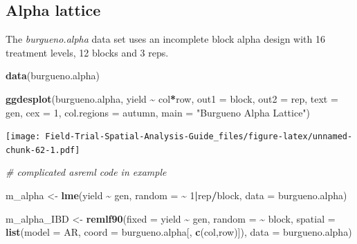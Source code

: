 \documentclass[
]{book}
\newenvironment{Shaded}{\begin{snugshade}}{\end{snugshade}}
\newcommand{\AttributeTok}[1]{\textcolor[rgb]{0.13,0.29,0.53}{#1}}
\newcommand{\CommentTok}[1]{\textcolor[rgb]{0.56,0.35,0.01}{\textit{#1}}}
\newcommand{\DecValTok}[1]{\textcolor[rgb]{0.00,0.00,0.81}{#1}}
\newcommand{\FunctionTok}[1]{\textcolor[rgb]{0.13,0.29,0.53}{\textbf{#1}}}
\newcommand{\NormalTok}[1]{#1}
\newcommand{\OtherTok}[1]{\textcolor[rgb]{0.56,0.35,0.01}{#1}}
\newcommand{\SpecialCharTok}[1]{\textcolor[rgb]{0.81,0.36,0.00}{\textbf{#1}}}
\newcommand{\StringTok}[1]{\textcolor[rgb]{0.31,0.60,0.02}{#1}}
\begin{document}
\hypertarget{alpha-lattice}{%
\subsection{Alpha lattice}\label{alpha-lattice}}

The \emph{burgueno.alpha} data set uses an incomplete block alpha design with 16 treatment levels, 12 blocks and 3 reps.

\begin{Shaded}
\begin{Highlighting}[]
\FunctionTok{data}\NormalTok{(burgueno.alpha)}

\FunctionTok{ggdesplot}\NormalTok{(burgueno.alpha, yield }\SpecialCharTok{\textasciitilde{}}\NormalTok{ col}\SpecialCharTok{*}\NormalTok{row, }\AttributeTok{out1 =}\NormalTok{ block, }\AttributeTok{out2 =}\NormalTok{ rep, }
        \AttributeTok{text =}\NormalTok{ gen, }\AttributeTok{cex =} \DecValTok{1}\NormalTok{, }\AttributeTok{col.regions =}\NormalTok{ autumn, }
        \AttributeTok{main =} \StringTok{"Burgueno Alpha Lattice"}\NormalTok{)}
\end{Highlighting}
\end{Shaded}

\texttt{[image: Field-Trial-Spatial-Analysis-Guide\_files/figure-latex/unnamed-chunk-62-1.pdf]}

\begin{Shaded}
\begin{Highlighting}[]
\CommentTok{\# complicated asreml code in example}

\NormalTok{m\_alpha }\OtherTok{\textless{}{-}} \FunctionTok{lme}\NormalTok{(yield }\SpecialCharTok{\textasciitilde{}}\NormalTok{ gen,}
               \AttributeTok{random =} \SpecialCharTok{\textasciitilde{}} \DecValTok{1}\SpecialCharTok{|}\NormalTok{rep}\SpecialCharTok{/}\NormalTok{block,}
               \AttributeTok{data =}\NormalTok{ burgueno.alpha)}

\NormalTok{m\_alpha\_IBD  }\OtherTok{\textless{}{-}} \FunctionTok{remlf90}\NormalTok{(}\AttributeTok{fixed  =}\NormalTok{ yield }\SpecialCharTok{\textasciitilde{}}\NormalTok{ gen,}
                      \AttributeTok{random =} \SpecialCharTok{\textasciitilde{}}\NormalTok{ block,}
                      \AttributeTok{spatial =} \FunctionTok{list}\NormalTok{(}\AttributeTok{model =} \StringTok{\textquotesingle{}AR\textquotesingle{}}\NormalTok{, }
                                 \AttributeTok{coord =}\NormalTok{ burgueno.alpha[, }\FunctionTok{c}\NormalTok{(}\StringTok{\textquotesingle{}col\textquotesingle{}}\NormalTok{,}\StringTok{\textquotesingle{}row\textquotesingle{}}\NormalTok{)]), }
                      \AttributeTok{data =}\NormalTok{ burgueno.alpha)}
\end{Highlighting}
\end{Shaded}
\end{document}
